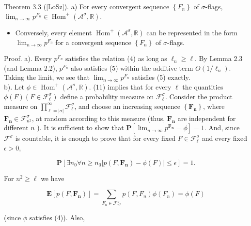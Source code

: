 \documentclass[10pt]{article}
\begin{document}
Theorem 3.3 ([LoSz]). a) For every convergent sequence $\left\{F_{n}\right\}$ of $\sigma$-flags, $\lim _{n \rightarrow \infty} p^{F_{n}} \in \operatorname{Hom}^{+}\left(\mathcal{A}^{\sigma}, \mathbb{R}\right)$.

\begin{itemize}
  \item[b)] Conversely, every element $\operatorname{Hom}^{+}\left(\mathcal{A}^{\sigma}, \mathbb{R}\right)$ can be represented in the form $\lim _{n \rightarrow \infty} p^{F_{n}}$ for a convergent sequence $\left\{F_{n}\right\}$ of $\sigma$-flags.
\end{itemize}

Proof. a). Every $p^{F_{n}}$ satisfies the relation (4) as long as $\ell_{n} \geq \ell$. By Lemma 2.3 (and Lemma 2.2), $p^{F_{n}}$ also satisfies (5) within the additive term $O\left(1 / \ell_{n}\right)$. Taking the limit, we see that $\lim _{n \rightarrow \infty} p^{F_{n}}$ satisfies (5) exactly.\\
b). Let $\phi \in \operatorname{Hom}^{+}\left(\mathcal{A}^{\sigma}, \mathbb{R}\right)$. (11) implies that for every $\ell$ the quantities $\phi(F)\left(F \in \mathcal{F}_{\ell}^{\sigma}\right)$ define a probability measure on $\mathcal{F}_{\ell}^{\sigma}$. Consider the product measure on $\prod_{\ell=|\sigma|}^{\infty} \mathcal{F}_{\ell}^{\sigma}$, and choose an increasing sequence $\left\{\boldsymbol{F}_{\boldsymbol{n}}\right\}$, where $\boldsymbol{F}_{\boldsymbol{n}} \in \mathcal{F}_{n^{2}}^{\sigma}$, at random according to this measure (thus, $\boldsymbol{F}_{\boldsymbol{n}}$ are independent for different $n$ ). It is sufficient to show that $\mathbf{P}\left[\lim _{n \rightarrow \infty} p^{\boldsymbol{F}_{\boldsymbol{n}}}=\phi\right]=1$. And, since $\mathcal{F}^{\sigma}$ is countable, it is enough to prove that for every fixed $F \in \mathcal{F}_{\ell}^{\sigma}$ and every fixed $\epsilon>0$,


\begin{equation*}
\mathbf{P}\left[\exists n_{0} \forall n \geq n_{0}\left|p\left(F, \boldsymbol{F}_{\boldsymbol{n}}\right)-\phi(F)\right| \leq \epsilon\right]=1 . \tag{14}
\end{equation*}


For $n^{2} \geq \ell$ we have

$$
\mathbf{E}\left[p\left(F, \boldsymbol{F}_{\boldsymbol{n}}\right)\right]=\sum_{F_{n} \in \mathcal{F}_{n^{2}}^{\sigma}} p\left(F, F_{n}\right) \phi\left(F_{n}\right)=\phi(F)
$$

(since $\phi$ satisfies (4)). Also,
\end{document}
